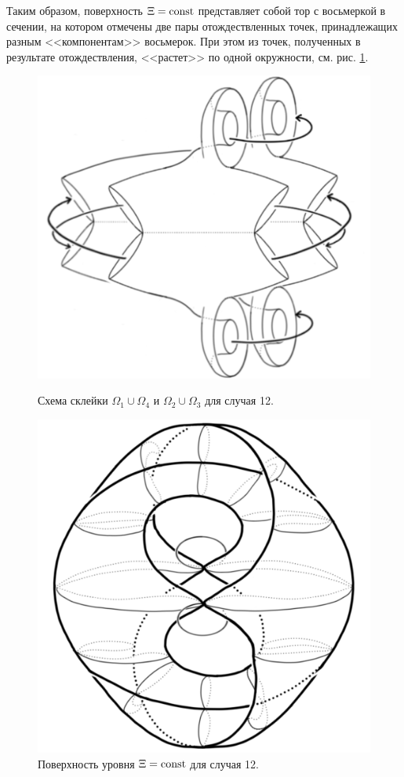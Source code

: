 Таким образом, поверхность $\Xi = \mathrm{const}$ представляет собой тор с восьмеркой в сечении, на котором отмечены  две пары отождествленных точек, принадлежащих разным <<компонентам>> восьмерок. При этом из точек, полученных в результате отождествления, <<растет>> по одной окружности, см. рис. \ref{fig:pt9:_atom_12}.


\begin{figure}[!htb]
\centering
\includegraphics[scale=0.3]{images/section2/atoms/atom_12_half.pdf}
    \caption{Схема склейки $\Omega_1 \cup \Omega_4$ и $\Omega_2 \cup \Omega_3$ для случая 12.}
    \label{fig:pt9:_atom_12_half}
\endminipage\hfill
{}
\centering
\includegraphics[scale=0.2]{images/section2/atoms/atom_12.pdf}
    \caption{Поверхность уровня $\Xi = \mathrm{const}$ для случая 12.}
    \label{fig:pt9:_atom_12}
\endminipage\hfill
\end{figure}



